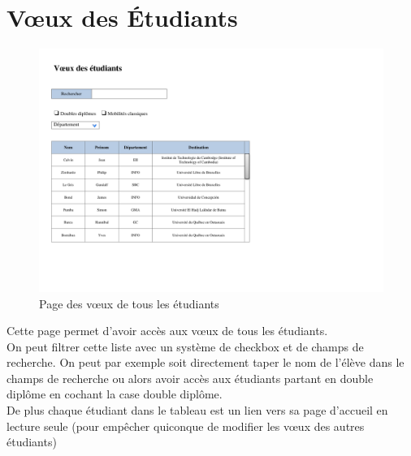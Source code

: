 \section{Vœux des Étudiants}
\label{sec::stud_wish}

\begin{figure}[H]
	\includegraphics[scale=0.8]{Etudiant/VoeuxEtudiants.pdf}
	\caption{Page des vœux de tous les étudiants}
\end{figure}

Cette page permet d'avoir accès aux vœux de tous les étudiants.\\
On peut filtrer cette liste avec un système de checkbox et de champs de recherche. On peut par exemple soit directement taper le nom de l'élève dans le champs de recherche ou alors avoir accès aux étudiants partant en double diplôme en cochant la case double diplôme.\\
De plus chaque étudiant dans le tableau est un lien vers sa page d'accueil en lecture seule (pour empêcher quiconque de modifier les vœux des autres étudiants)